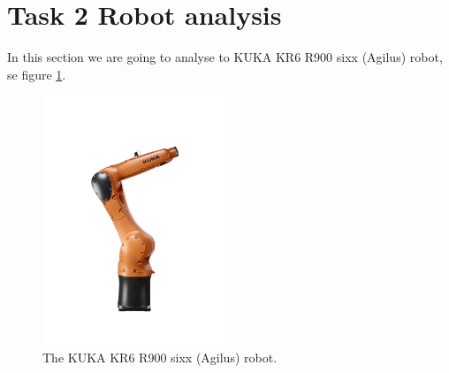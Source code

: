 \newpage
\section{Task 2 Robot analysis}
In this section we are going to analyse to KUKA KR6 R900 sixx (Agilus) robot, se figure \ref{fig:KUKA_Agilus}.

\begin{figure}[H]
    \centering
    \includegraphics[width=0.5\textwidth]{Images/Task2/KUKA_KR6_R900_sixx_(Agilus).jpeg}
    \caption[KUKA KR6 R900 sixx (Agilus) robot]{The KUKA KR6 R900 sixx (Agilus) robot.}
    \label{fig:KUKA_Agilus}
\end{figure}

